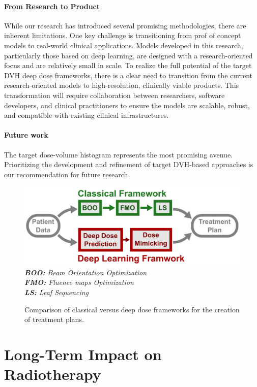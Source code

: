\paragraph{From Research to Product}
While our research has introduced several promising methodologies, there are inherent limitations.
One key challenge is transitioning from prof of concept models to real-world clinical applications.
Models developed in this research, particularly those based on deep learning, are designed with a research-oriented focus and are relatively small in scale.
To realize the full potential of the target DVH deep dose frameworks, there is a clear need to transition from the current research-oriented models to high-resolution, clinically viable products.
This transformation will require collaboration between researchers, software developers, and clinical practitioners to ensure the models are scalable, robust, and compatible with existing clinical infrastructures.

\paragraph{Future work}
The target dose-volume histogram represents the most promising avenue.
Prioritizing the development and refinement of target DVH-based approaches is our recommendation for future research.

\begin{figure}
	\includegraphics[width=\linewidth]{frameworks.pdf}
	\textit{
		\textbf{BOO:} Beam Orientation Optimization\\
		\textbf{FMO:} Fluence maps Optimization\\
		\textbf{LS:} Leaf Sequencing
	}
	\caption{Comparison of classical versus deep dose frameworks for the creation of treatment plans.}
	\label{fig:frameworks_comparison}
\end{figure}

\section{Long-Term Impact on Radiotherapy}
